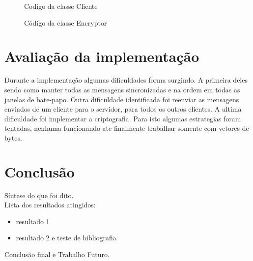 \documentclass[a4paper,12pt]{article}
\begin{document}
\begin{figure}[H]

\caption{Codigo da classe Cliente}
\end{figure}

\begin{figure}[H]

\caption{Código da classe Encryptor}
\end{figure}


\section{Avaliação da implementação}
Durante a implementação algumas dificuldades forma surgindo. A primeira deles sendo como manter todas as mensagens sincronizadas e na ordem em todas as janelas de bate-papo.
Outra dificuldade identificada foi reenviar as mensagens enviados de um cliente para o servidor, para todos os outros clientes.
A ultima dificuldade foi implementar a criptografia. Para isto algumas estrategias foram tentadas, nenhuma funcionando ate finalmente trabalhar somente com vetores de bytes.
\section{Conclusão}
Síntese do que foi dito.\\
Lista dos resultados atingidos:
\begin{itemize}
\item resultado 1
\item resultado 2 e teste de bibliografia \cite{Bulfinch1998}
\end{itemize}
Conclusão final e Trabalho Futuro.



\end{document}
